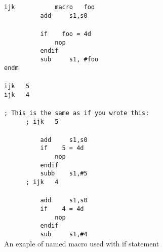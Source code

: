         {
                ~\\
                \usecodefont\\
            \verb'ijk           macro   foo'\\
            \verb'          add     s1,s0'\\
            \verb''\\
            \verb'          if    foo = 4d'\\
            \verb'              nop'\\
            \verb'          endif'\\
            \verb'          sub     s1, #foo'\\
            \verb'endm'\\\\
            \verb'ijk   5'\\
            \verb'ijk   4'\\\\
            \verb'; This is the same as if you wrote this:'\\
            \verb'      ; ijk   5'\\\\
            \verb'          add     s1,s0'\\
            \verb'          if    5 = 4d'\\
            \verb'              nop'\\
            \verb'          endif'\\
            \verb'          subb    s1,#5'\\
            \verb'      ; ijk   4'\\\\
            \verb'          add     s1,s0'\\
            \verb'          if    4 = 4d'\\
            \verb'              nop'\\
            \verb'          endif'\\
            \verb'          sub     s1,#4'\\
        }
        An exaple of named macro used with if statement


